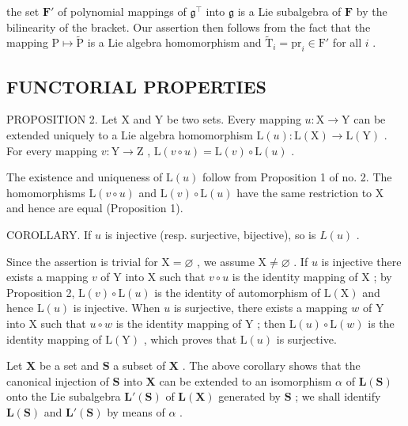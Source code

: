the set \(\mathbf{F}'\) of polynomial mappings of \(\mathfrak{g}^{\intercal}\) into \(\mathfrak{g}\) is a Lie subalgebra of \(\mathbf{F}\) by the bilinearity of the bracket. Our assertion then follows from the fact that the mapping \(\mathrm{P} \mapsto \tilde{\mathrm{P}}\) is a Lie algebra homomorphism and \(\tilde{\mathrm{T}}_i = \mathrm{pr}_i \in \mathrm{F}'\) for all \(i\) .

\subsection{FUNCTORIAL PROPERTIES}

PROPOSITION 2. Let X and Y be two sets. Every mapping \(u: \mathrm{X} \to \mathrm{Y}\) can be extended uniquely to a Lie algebra homomorphism \(\mathrm{L}(u): \mathrm{L}(\mathrm{X}) \to \mathrm{L}(\mathrm{Y})\) . For every mapping \(v: \mathrm{Y} \to \mathrm{Z}\) , \(\mathrm{L}(v \circ u) = \mathrm{L}(v) \circ \mathrm{L}(u)\) .

The existence and uniqueness of \(\mathrm{L}(u)\) follow from Proposition 1 of no. 2. The homomorphisms \(\mathrm{L}(v\circ u)\) and \(\mathrm{L}(v)\circ \mathrm{L}(u)\) have the same restriction to X and hence are equal (Proposition 1).

COROLLARY. If \(u\) is injective (resp. surjective, bijective), so is \(L(u)\) .

Since the assertion is trivial for \(\mathrm{X} = \varnothing\) , we assume \(\mathrm{X} \neq \varnothing\) . If \(u\) is injective there exists a mapping \(v\) of \(\mathrm{Y}\) into \(\mathrm{X}\) such that \(v \circ u\) is the identity mapping of \(\mathrm{X}\) ; by Proposition 2, \(\mathrm{L}(v) \circ \mathrm{L}(u)\) is the identity of automorphism of \(\mathrm{L}(\mathrm{X})\) and hence \(\mathrm{L}(u)\) is injective. When \(u\) is surjective, there exists a mapping \(w\) of \(\mathrm{Y}\) into \(\mathrm{X}\) such that \(u \circ w\) is the identity mapping of \(\mathrm{Y}\) ; then \(\mathrm{L}(u) \circ \mathrm{L}(w)\) is the identity mapping of \(\mathrm{L}(\mathrm{Y})\) , which proves that \(\mathrm{L}(u)\) is surjective.

Let \(\mathbf{X}\) be a set and \(\mathbf{S}\) a subset of \(\mathbf{X}\) . The above corollary shows that the canonical injection of \(\mathbf{S}\) into \(\mathbf{X}\) can be extended to an isomorphism \(\alpha\) of \(\mathbf{L}(\mathbf{S})\) onto the Lie subalgebra \(\mathbf{L}'(\mathbf{S})\) of \(\mathbf{L}(\mathbf{X})\) generated by \(\mathbf{S}\) ; we shall identify \(\mathbf{L}(\mathbf{S})\) and \(\mathbf{L}'(\mathbf{S})\) by means of \(\alpha\) .

